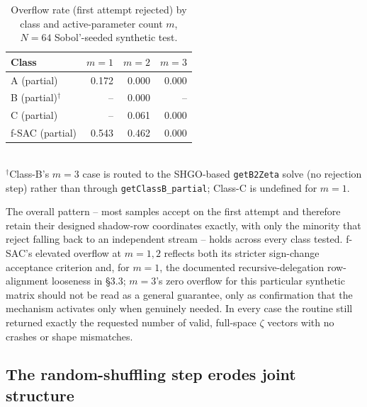\documentclass[11pt]{article}
\newcommand{\code}[1]{\texttt{#1}}
\begin{document}
\begin{table}[h]
\centering
\caption{Overflow rate (first attempt rejected) by class and active-parameter count $m$, $N=64$ Sobol'-seeded synthetic test.}
\label{tab:overflow}
\begin{tabular}{@{}lrrr@{}}
\toprule
Class & $m=1$ & $m=2$ & $m=3$ \\
\midrule
A (partial)        & 0.172 & 0.000 & 0.000 \\
B (partial)$^\dagger$ & --    & 0.000 & --    \\
C (partial)        & --    & 0.061 & 0.000 \\
f-SAC (partial)    & 0.543 & 0.462 & 0.000 \\
\bottomrule
\end{tabular}
\\[2pt]
\footnotesize $^\dagger$Class-B's $m=3$ case is routed to the SHGO-based \code{getB2Zeta} solve (no rejection step) rather than through \code{getClassB\_partial}; Class-C is undefined for $m=1$.
\end{table}

The overall pattern -- most samples accept on the first attempt and therefore retain their designed shadow-row coordinates exactly, with only the minority that reject falling back to an independent stream -- holds across every class tested. f-SAC's elevated overflow at $m=1,2$ reflects both its stricter sign-change acceptance criterion and, for $m=1$, the documented recursive-delegation row-alignment looseness in \S3.3; $m=3$'s zero overflow for this particular synthetic matrix should not be read as a general guarantee, only as confirmation that the mechanism activates only when genuinely needed. In every case the routine still returned exactly the requested number of valid, full-space $\zeta$ vectors with no crashes or shape mismatches.

\subsection{The random-shuffling step erodes joint structure}
\end{document}
